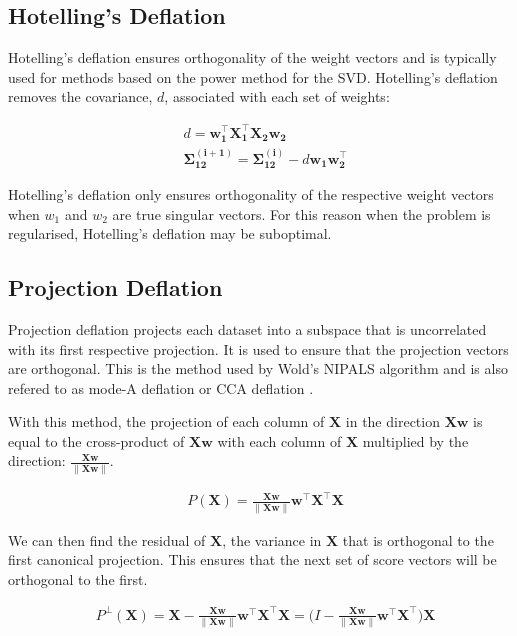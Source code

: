 \subsection{Hotelling's Deflation}
Hotelling's deflation ensures orthogonality of the weight vectors and is typically used for methods based on the power method for the SVD. Hotelling's deflation removes the covariance, $d$, associated with each set of weights:

\begin{align}
     & d = \mathbf{w^{\top}_1X^{\top}_1X_2w_2}                                            \\
     & \mathbf{\Sigma^{(i+1)}_{12}}= \mathbf{\Sigma^{(i)}_{12}} - d\mathbf{w_1w^{\top}_2}
\end{align}

Hotelling's deflation only ensures orthogonality of the respective weight vectors when $w_1$ and $w_2$ are true singular vectors. For this reason when the problem is regularised, Hotelling's deflation may be suboptimal.

\subsection{Projection Deflation}

Projection deflation projects each dataset into a subspace that is uncorrelated with its first respective projection. It is used to ensure that the projection vectors are orthogonal. This is the method used by Wold's NIPALS algorithm and is also refered to as mode-A deflation or CCA deflation \cite{mackey2009deflation}.

With this method, the projection of each column of $\mathbf{X}$ in the direction $\mathbf{Xw}$ is equal to the cross-product of $\mathbf{Xw}$ with each column of $\mathbf{X}$ multiplied by the direction: $\frac{\mathbf{Xw}}{\|\mathbf{Xw}\|}$.

\begin{align}
     & P(\mathbf{X})= \frac{\mathbf{Xw}}{\|\mathbf{Xw}\|}\mathbf{w^{\top}X^{\top}X}
\end{align}

We can then find the residual of $\mathbf{X}$, the variance in $\mathbf{X}$  that is orthogonal to the first canonical projection. This ensures that the next set of score vectors will be orthogonal to the first.

\begin{align}
     & P^\perp(\mathbf{X})= \mathbf{X} - \frac{\mathbf{Xw}}{\|\mathbf{Xw}\|}\mathbf{w^{\top}X^{\top}X} = (I - \frac{\mathbf{Xw}}{\|\mathbf{Xw}\|}\mathbf{w^{\top}X^{\top})X}
\end{align}




